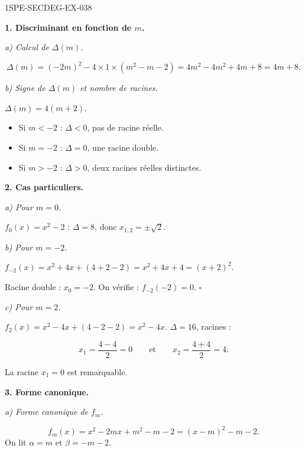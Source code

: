 \begin{corrige}{1SPE-SECDEG-EX-038}

\textbf{1. Discriminant en fonction de $m$.}

\textit{a) Calcul de $\Delta(m)$.}


\[\Delta(m) = (-2m)^2 - 4 \times 1 \times (m^2 - m - 2) = 4m^2 - 4m^2 + 4m + 8 = 4m + 8.\]

\textit{b) Signe de $\Delta(m)$ et nombre de racines.}


$\Delta(m) = 4(m + 2)$.
\begin{itemize}
  \item Si $m < -2$ : $\Delta < 0$, pas de racine réelle.
  \item Si $m = -2$ : $\Delta = 0$, une racine double.
  \item Si $m > -2$ : $\Delta > 0$, deux racines réelles distinctes.
\end{itemize}

\medskip
\textbf{2. Cas particuliers.}

\textit{a) Pour $m = 0$.}


$f_0(x) = x^2 - 2$ : $\Delta = 8$, donc $x_{1,2} = \pm\sqrt{2}$.

\textit{b) Pour $m = -2$.}


$f_{-2}(x) = x^2 + 4x + (4 + 2 - 2) = x^2 + 4x + 4 = (x+2)^2$.

Racine double : $x_0 = -2$. On vérifie : $f_{-2}(-2) = 0$. \hfill $\square$

\textit{c) Pour $m = 2$.}

$f_2(x) = x^2 - 4x + (4 - 2 - 2) = x^2 - 4x$. $\Delta = 16$, racines :

\[x_1 = \frac{4 - 4}{2} = 0 \qquad \text{et} \qquad x_2 = \frac{4 + 4}{2} = 4.\]

La racine $x_1 = 0$ est remarquable.

\medskip
\textbf{3. Forme canonique.}

\textit{a) Forme canonique de $f_m$.}


\[f_m(x)=x^2-2mx+m^2-m-2=(x-m)^2-m-2.\]
On lit $\alpha=m$ et $\beta=-m-2$.


\end{corrige}
